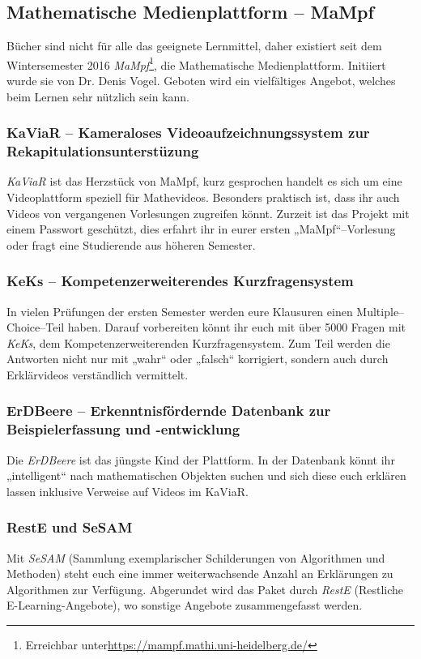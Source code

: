 \subsection{Mathematische Medienplattform -- MaMpf}
\label{mampf}

Bücher sind nicht für alle das geeignete Lernmittel, daher existiert seit dem Wintersemester 2016 \emph{MaMpf}\footnote{Erreichbar unter\url{https://mampf.mathi.uni-heidelberg.de/}}, die Mathematische Medienplattform. Initiiert wurde sie von Dr. Denis Vogel. Geboten wird ein vielfältiges Angebot, welches beim Lernen sehr nützlich sein kann.

\subsubsection{KaViaR -- Kameraloses Videoaufzeichnungssystem zur Rekapitulationsunterstüzung}
\emph{KaViaR} ist das Herzstück von MaMpf, kurz gesprochen handelt es sich um eine Videoplattform speziell für Mathevideos. Besonders praktisch ist, dass ihr auch Videos von vergangenen Vorlesungen zugreifen könnt. Zurzeit ist das Projekt  mit einem Passwort geschützt, dies erfahrt ihr in eurer ersten „MaMpf“--Vorlesung oder fragt eine Studierende aus höheren Semester.

\subsubsection{KeKs -- Kompetenzerweiterendes Kurzfragensystem}
In vielen Prüfungen der ersten Semester werden eure Klausuren einen Multiple--Choice--Teil haben.  Darauf vorbereiten könnt ihr euch mit über 5000 Fragen mit \emph{KeKs}, dem Kompetenzerweiterenden Kurzfragensystem. Zum Teil werden die Antworten nicht nur mit „wahr“ oder „falsch“ korrigiert, sondern auch durch Erklärvideos verständlich vermittelt.

\subsubsection{ErDBeere -- Erkenntnisfördernde Datenbank zur Beispielerfassung und -entwicklung}
 Die \emph{ErDBeere} ist das jüngste Kind der Plattform. In der Datenbank könnt ihr „intelligent“ nach mathematischen Objekten suchen und sich diese euch erklären lassen inklusive Verweise auf Videos im KaViaR.

\subsubsection{RestE und SeSAM}
Mit \emph{SeSAM} (Sammlung exemplarischer Schilderungen von Algorithmen und Methoden) steht euch eine immer weiterwachsende Anzahl an Erklärungen zu Algorithmen zur Verfügung. Abgerundet wird das Paket durch \emph{RestE} (Restliche E-Learning-Angebote), wo sonstige Angebote zusammengefasst werden.
